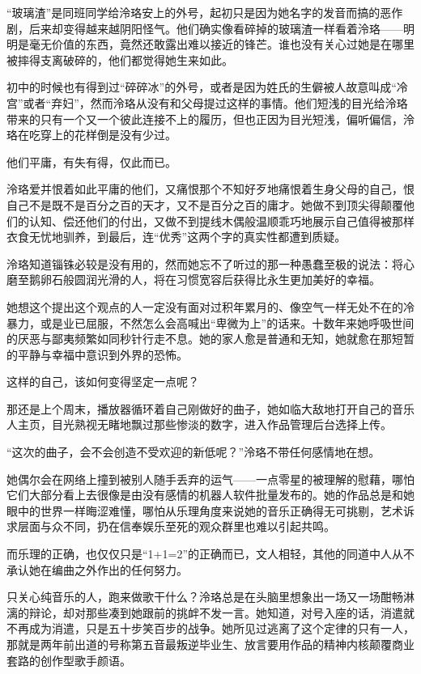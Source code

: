 \documentclass[UTF8, scheme = chinese, openany]{ctexbook}
\begin{document}
“玻璃渣”是同班同学给泠珞安上的外号，起初只是因为她名字的发音而搞的恶作剧，后来却变得越来越阴阳怪气。他们确实像看碎掉的玻璃渣一样看着泠珞——明明是毫无价值的东西，竟然还敢露出难以接近的锋芒。谁也没有关心过她是在哪里被摔得支离破碎的，他们都觉得她生来如此。

初中的时候也有得到过“碎碎冰”的外号，或者是因为姓氏的生僻被人故意叫成“冷宫”或者“弃妇”，然而泠珞从没有和父母提过这样的事情。他们短浅的目光给泠珞带来的只有一个又一个彼此连接不上的履历，但也正因为目光短浅，偏听偏信，泠珞在吃穿上的花样倒是没有少过。

他们平庸，有失有得，仅此而已。

泠珞爱并恨着如此平庸的他们，又痛恨那个不知好歹地痛恨着生身父母的自己，恨自己不是既不是百分之百的天才，又不是百分之百的庸才。她做不到顶尖得颠覆他们的认知、偿还他们的付出，又做不到提线木偶般温顺乖巧地展示自己值得被那样衣食无忧地驯养，到最后，连“优秀”这两个字的真实性都遭到质疑。

泠珞知道锱铢必较是没有用的，然而她忘不了听过的那一种愚蠢至极的说法：将心磨至鹅卵石般圆润光滑的人，将在习惯宽容后获得比永生更加美好的幸福。

她想这个提出这个观点的人一定没有面对过积年累月的、像空气一样无处不在的冷暴力，或是业已屈服，不然怎么会高喊出“卑微为上”的话来。十数年来她呼吸世间的厌恶与鄙夷频繁如同秒针行走不息。她的家人愈是普通和无知，她就愈在那短暂的平静与幸福中意识到外界的恐怖。

这样的自己，该如何变得坚定一点呢？

那还是上个周末，播放器循环着自己刚做好的曲子，她如临大敌地打开自己的音乐人主页，目光熟视无睹地飘过那些惨淡的数字，进入作品管理后台选择上传。

“这次的曲子，会不会创造不受欢迎的新低呢？”泠珞不带任何感情地在想。

她偶尔会在网络上撞到被别人随手丢弃的运气——一点零星的被理解的慰藉，哪怕它们大部分看上去很像是由没有感情的机器人软件批量发布的。她的作品总是和她眼中的世界一样晦涩难懂，哪怕从乐理角度来说她的音乐正确得无可挑剔，艺术诉求层面与众不同，扔在信奉娱乐至死的观众群里也难以引起共鸣。

而乐理的正确，也仅仅只是“1+1=2”的正确而已，文人相轻，其他的同道中人从不承认她在编曲之外作出的任何努力。

只关心纯音乐的人，跑来做歌干什么？泠珞总是在头脑里想象出一场又一场酣畅淋漓的辩论，却对那些凑到她跟前的挑衅不发一言。她知道，对号入座的话，消遣就不再成为消遣，只是五十步笑百步的战争。她所见过逃离了这个定律的只有一人，那就是两年前出道的号称第五音最叛逆毕业生、放言要用作品的精神内核颠覆商业套路的创作型歌手颜语。
\end{document}
